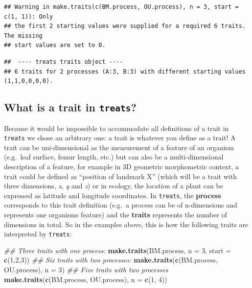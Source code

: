 \documentclass[
]{book}
\newenvironment{Shaded}{\begin{snugshade}}{\end{snugshade}}
\newcommand{\CommentTok}[1]{\textcolor[rgb]{0.56,0.35,0.01}{\textit{#1}}}
\newcommand{\DataTypeTok}[1]{\textcolor[rgb]{0.13,0.29,0.53}{#1}}
\newcommand{\DecValTok}[1]{\textcolor[rgb]{0.00,0.00,0.81}{#1}}
\newcommand{\KeywordTok}[1]{\textcolor[rgb]{0.13,0.29,0.53}{\textbf{#1}}}
\newcommand{\NormalTok}[1]{#1}
\begin{document}
\begin{verbatim}
## Warning in make.traits(c(BM.process, OU.process), n = 3, start = c(1, 1)): Only
## the first 2 starting values were supplied for a required 6 traits. The missing
## start values are set to 0.
\end{verbatim}

\begin{verbatim}
##  ---- treats traits object ---- 
## 6 traits for 2 processes (A:3, B:3) with different starting values (1,1,0,0,0,0).
\end{verbatim}

\hypertarget{what-is-a-trait-in-treats}{%
\subsection{\texorpdfstring{What is a trait in \texttt{treats}?}{What is a trait in treats?}}\label{what-is-a-trait-in-treats}}

Because it would be impossible to accommodate all definitions of a trait in \texttt{treats} we chose an arbitrary one: a trait is whatever you define as a trait!
A trait can be uni-dimensional as the measurement of a feature of an organism (e.g.~leaf surface, femur length, etc.) but can also be a multi-dimensional description of a feature, for example in 3D geometric morphometric context, a trait could be defined as ``position of landmark X'' (which will be a trait with three dimensions, \emph{x}, \emph{y} and \emph{z}) or in ecology, the location of a plant can be expressed as latitude and longitude coordinates.
In \texttt{treats}, the \textbf{process} corresponds to this trait definition (e.g.~a process can be of n-dimensions and represents one organisms feature) and the \textbf{traits} represents the number of dimensions in total.
So in the examples above, this is how the following traits are interpreted by \texttt{treats}:

\begin{Shaded}
\begin{Highlighting}[]
\CommentTok{\#\# Three traits with one process:}
\KeywordTok{make.traits}\NormalTok{(BM.process, }\DataTypeTok{n =} \DecValTok{3}\NormalTok{, }\DataTypeTok{start =} \KeywordTok{c}\NormalTok{(}\DecValTok{1}\NormalTok{,}\DecValTok{2}\NormalTok{,}\DecValTok{3}\NormalTok{))}
\CommentTok{\#\# Six traits with two processes:}
\KeywordTok{make.traits}\NormalTok{(}\KeywordTok{c}\NormalTok{(BM.process, OU.process), }\DataTypeTok{n =} \DecValTok{3}\NormalTok{)}
\CommentTok{\#\# Five traits with two processes}
\KeywordTok{make.traits}\NormalTok{(}\KeywordTok{c}\NormalTok{(BM.process, OU.process), }\DataTypeTok{n =} \KeywordTok{c}\NormalTok{(}\DecValTok{1}\NormalTok{, }\DecValTok{4}\NormalTok{))}
\end{Highlighting}
\end{Shaded}
\end{document}
